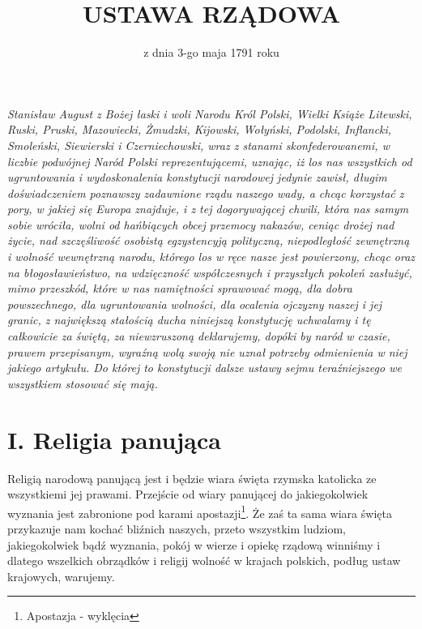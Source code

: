 \documentclass{book}
\begin{document}
\pagestyle{plain}

\title{USTAWA RZĄDOWA}
\date{z dnia 3-go maja 1791 roku}
\maketitle

\vspace*{\fill}
\begin{Large}
\begin{centering}
\textit{Stanisław August z Bożej łaski i woli Narodu Król Polski, Wielki Książe Litewski, Ruski, Pruski, Mazowiecki, Żmudzki, Kijowski, Wołyński, Podolski, Inflancki,  Smoleński, Siewierski i Czerniechowski, wraz z stanami skonfederowanemi, w liczbie podwójnej Naród Polski reprezentującemi, uznając, iż los nas wszystkich  od ugruntowania i wydoskonalenia konstytucji narodowej jedynie zawisł, długim doświadczeniem poznawszy zadawnione rządu naszego wady, a chcąc korzystać z pory, w jakiej się Europa znajduje, i z tej dogorywającej chwili, która nas samym sobie wróciła, wolni od hańbiących obcej przemocy nakazów, ceniąc drożej nad życie,  nad szczęśliwość osobistą egzystencyją polityczną, niepodległość zewnętrzną i wolność wewnętrzną narodu, którego los w ręce nasze jest powierzony,  chcąc oraz na błogosławieństwo, na wdzięczność współczesnych i przyszłych pokoleń zasłużyć, mimo przeszkód, które w nas namiętności sprawować mogą,  dla dobra powszechnego, dla ugruntowania wolności, dla ocalenia ojczyzny naszej i jej granic, z największą stałością ducha niniejszą konstytucję uchwalamy  i tę całkowicie za świętą, za niewzruszoną deklarujemy, dopóki by naród w czasie,  prawem przepisanym, wyraźną  wolą swoją nie uznał potrzeby odmienienia w niej jakiego artykułu.  Do której to konstytucji dalsze ustawy sejmu teraźniejszego we wszystkiem stosować się mają.}
\end{centering}
\end{Large}

\newpage
{} 

 
\section*{I. Religia panująca}

 Religią narodową panującą jest i będzie wiara święta rzymska katolicka ze wszystkiemi jej prawami.  Przejście od wiary panującej do jakiegokolwiek wyznania jest zabronione pod karami apostazji\footnote{Apostazja - wyklęcia}. Że zaś ta sama wiara święta przykazuje nam kochać bliźnich naszych, przeto wszystkim ludziom, jakiegokolwiek bądź wyznania,  pokój w wierze i opiekę rządową winniśmy i dlatego wszelkich obrządków i religij wolność w krajach polskich, podług ustaw krajowych, warujemy.  
\end{document}
